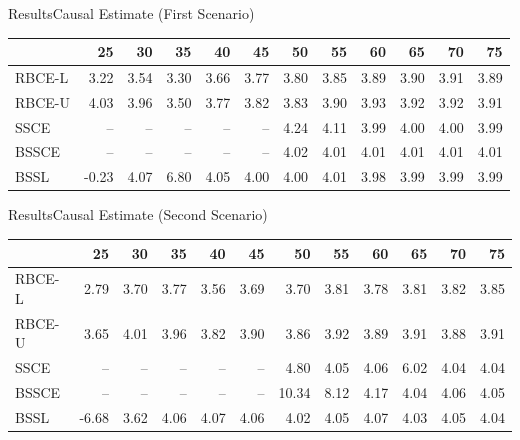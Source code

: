 \documentclass[aspectratio=169]{beamer}					%
\begin{document}
\begin{frame}{Results}{Causal Estimate (First Scenario)}
\begin{table}[ht]
\centering
\begin{tabular}{|l|:rrr:rrrrrrrr|}
  \hline
 & 25 & 30 & 35 & 40 & 45 & 50 & 55 & 60 & 65 & 70 & 75 \\ 
  \hline
RBCE-L & \alert{3.22} & \alert{3.54} & \alert{3.30} & 3.66 & 3.77 & 3.80 & 3.85 & 3.89 & 3.90 & 3.91 & 3.89 \\ 
  RBCE-U & \alert{4.03} & \alert{3.96} & \alert{3.50} & 3.77 & 3.82 & 3.83 & 3.90 & 3.93 & 3.92 & 3.92 & 3.91 \\ 
  SSCE & -- & -- & -- & -- & -- & 4.24 & 4.11 & 3.99 & 4.00 & 4.00 & 3.99 \\ 
  BSSCE & -- & -- & -- & -- & -- & 4.02 & 4.01 & 4.01 & 4.01 & 4.01 & 4.01 \\ 
  BSSL & -0.23 & 4.07 & 6.80 & 4.05 & 4.00 & 4.00 & 4.01 & 3.98 & 3.99 & 3.99 & 3.99 \\ 
   \hline
\end{tabular}
\end{table}

\end{frame}

\begin{frame}{Results}{Causal Estimate (Second Scenario)}
\begin{table}[ht]
\label{tab:causal}
\centering
\begin{tabular}{|l|:rrr:rrrrrrrr|}
  \hline
 & 25 & 30 & 35 & 40 & 45 & 50 & 55 & 60 & 65 & 70 & 75 \\ 
  \hline
RBCE-L & \alert{2.79} & \alert{3.70} & \alert{3.77} & 3.56 & 3.69 & 3.70 & 3.81 & 3.78 & 3.81 & 3.82 & 3.85 \\ 
  RBCE-U & \alert{3.65} & \alert{4.01} & \alert{3.96} & 3.82 & 3.90 & 3.86 & 3.92 & 3.89 & 3.91 & 3.88 & 3.91 \\ 
  SSCE & -- & -- & -- & -- & -- & 4.80 & 4.05 & 4.06 & 6.02 & 4.04 & 4.04 \\ 
  BSSCE & -- & -- & -- & -- & -- & 10.34 & 8.12 & 4.17 & 4.04 & 4.06 & 4.05 \\ 
  BSSL & -6.68 & 3.62 & 4.06 & 4.07 & 4.06 & 4.02 & 4.05 & 4.07 & 4.03 & 4.05 & 4.04 \\ 
   \hline
\end{tabular}
\end{table}
\end{frame}
\end{document}
